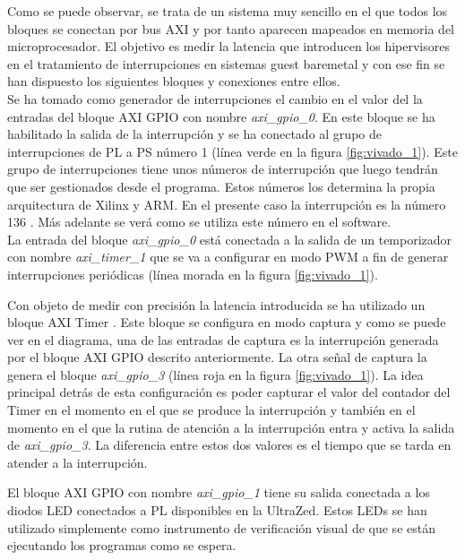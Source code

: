 Como se puede observar, se trata de un sistema muy sencillo en el que todos los bloques se conectan por bus AXI y por tanto aparecen mapeados en memoria del microprocesador. El objetivo es medir la latencia que introducen los hipervisores en el tratamiento de interrupciones en sistemas guest baremetal y con ese fin se han dispuesto los siguientes bloques y conexiones entre ellos.\\

Se ha tomado como generador de interrupciones el cambio en el valor del la entradas del bloque \acrshort{AXI} \acrshort{GPIO} con nombre \textit{axi\_gpio\_0}.
En este bloque se ha habilitado la salida de la interrupción y se ha conectado al grupo de interrupciones de \acrshort{PL} a \acrshort{PS} número 1 (línea verde en la figura \ref{fig:vivado_1}). Este grupo de interrupciones tiene unos números de interrupción que luego tendrán que ser gestionados desde el programa. Estos números los determina la propia arquitectura de Xilinx y ARM. En el presente caso la interrupción es la número 136 \cite{axi_trm}. Más adelante se verá como se utiliza este número en el software.\\
La entrada del bloque \textit{axi\_gpio\_0} está conectada a la salida de un temporizador con nombre \textit{axi\_timer\_1} que se va a configurar en modo \acrshort{PWM} a fin de generar interrupciones periódicas (línea morada en la figura \ref{fig:vivado_1}).


Con objeto de medir con precisión la latencia introducida se ha utilizado un bloque \acrshort{AXI} Timer \cite{axi_timer}. Este bloque se configura en modo captura y como se puede ver en el diagrama, una de las entradas de captura es la interrupción generada por el bloque \acrshort{AXI} \acrshort{GPIO} descrito anteriormente. La otra señal de captura la genera el bloque \textit{axi\_gpio\_3} (línea roja en la figura \ref{fig:vivado_1}). La idea principal detrás de esta configuración es poder capturar el valor del contador del Timer en el momento en el que se produce la interrupción y también en el momento en el que la rutina de atención a la interrupción entra y activa la salida de \textit{axi\_gpio\_3}. La diferencia entre estos dos valores es el tiempo que se tarda en atender a la interrupción.

El bloque \acrshort{AXI} \acrshort{GPIO} con nombre \textit{axi\_gpio\_1} tiene su salida conectada a los diodos LED conectados a \acrshort{PL} disponibles en la UltraZed. Estos LEDs se han utilizado simplemente como instrumento de verificación visual de que se están ejecutando los programas como se espera.\\

